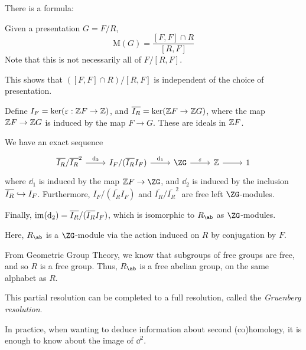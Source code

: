 \documentclass{article}
\begin{document}
There is a formula:

\begin{theorem}
    [Hopf]
    \label{thm:hopf}
    Given a presentation \(G = F/R\),
    \[\mathrm{M}(G) = \frac{[F, F] \cap R}{[R, F]}\]
    Note that this is not necessarily all of \(F/[R, F]\).
\end{theorem}

\begin{remark}
    This shows that \(([F, F] \cap R)/[R, F]\) is independent of the choice of presentation. 
\end{remark}

\lec

Define \(I_F = \ker(\varepsilon : \mathbb{Z} F \to \mathbb{Z})\), and \(\overline{I_R} = \ker(\mathbb{Z} F \to \mathbb{Z} G)\), where the map \(\mathbb{Z} F \to \mathbb{Z} G\) is induced by the map \(F \to G\). These are ideals in \(\mathbb{Z} F\).

\begin{proposition}
    \label{prop:presentation-partial-resolution}
    We have an exact sequence
\[\begin{tikzcd}
	{\overline{I_R}/\overline{I_R}^2} & {{I_F}/(\overline{I_R}I_F)} & \ZG & \Z & 1
	\arrow["{\dd_2}", from=1-1, to=1-2]
	\arrow["{\dd_1}", from=1-2, to=1-3]
	\arrow["\epsilon", from=1-3, to=1-4]
	\arrow[from=1-4, to=1-5]
\end{tikzcd}\]
    where \(\dd_1\) is induced by the map \(\Z F \to \ZG\), and \(\dd_2\) is induced by the inclusion \(\overline{I_R} \hookrightarrow I_F\). Furthermore, \(I_F/(\overline{I_R}I_F)\) and \(\overline{I_R}/\overline{I_R}^2\) are free left \(\ZG\)-modules.

    Finally, \(\operatorname{im}(\dd_2) = \overline{I_R}/(\overline{I_R}I_F)\), which is isomorphic to \(R_\ab\) as \(\ZG\)-modules.
\end{proposition}

\begin{remark}
    Here, \(R_\ab\) is a \(\ZG\)-module via the action induced on \(R\) by conjugation by \(F\).

    From Geometric Group Theory, we know that subgroups of free groups are free, and so \(R\) is a free group. Thus, \(R_\ab\) is a free abelian group, on the same alphabet as \(R\).

    This partial resolution can be completed to a full resolution, called the \emph{Gruenberg resolution}.

    In practice, when wanting to deduce information about second (co)homology, it is enough to know about the image of \(\dd^2\).
\end{remark}
\end{document}
